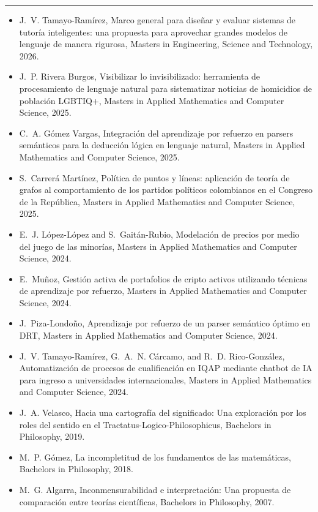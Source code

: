 \documentclass[10pt]{article}
\newcommand{\cvsection}[1]{%
  \par\vspace{0.55em}%
  \noindent{\sffamily\bfseries\MakeUppercase{#1}}\par
  \vspace{-0.35em}%
  \noindent\rule{\textwidth}{0.4pt}\par
  \vspace{0.2em}%
}
\begin{document}
\cvsection{Students Supervised}
\begin{itemize}
  \item J.~V. Tamayo-Ram\'irez, Marco general para dise\~nar y evaluar sistemas de tutor\'ia inteligentes: una propuesta para aprovechar grandes modelos de lenguaje de manera rigurosa, Masters in Engineering, Science and Technology, 2026.
  \item J.~P. Rivera Burgos, Visibilizar lo invisibilizado: herramienta de procesamiento de lenguaje natural para sistematizar noticias de homicidios de poblaci\'on LGBTIQ+, Masters in Applied Mathematics and Computer Science, 2025.
  \item C.~A. G\'omez Vargas, Integraci\'on del aprendizaje por refuerzo en parsers sem\'anticos para la deducci\'on l\'ogica en lenguaje natural, Masters in Applied Mathematics and Computer Science, 2025.
  \item S.~Carrer\'a Mart\'inez, Pol\'itica de puntos y l\'ineas: aplicaci\'on de teor\'ia de grafos al comportamiento de los partidos pol\'iticos colombianos en el Congreso de la Rep\'ublica, Masters in Applied Mathematics and Computer Science, 2025.
  \item E.~J. L\'opez-L\'opez and S.~Gait\'an-Rubio, Modelaci\'on de precios por medio del juego de las minor\'ias, Masters in Applied Mathematics and Computer Science, 2024.
  \item E.~Mu\~noz, Gesti\'on activa de portafolios de cripto activos utilizando t\'ecnicas de aprendizaje por refuerzo, Masters in Applied Mathematics and Computer Science, 2024.
  \item J.~Piza-Londo\~no, Aprendizaje por refuerzo de un parser sem\'antico \'optimo en DRT, Masters in Applied Mathematics and Computer Science, 2024.
  \item J.~V. Tamayo-Ram\'irez, G.~A.~N. C\'arcamo, and R.~D. Rico-Gonz\'alez, Automatizaci\'on de procesos de cualificaci\'on en IQAP mediante chatbot de IA para ingreso a universidades internacionales, Masters in Applied Mathematics and Computer Science, 2024.
  \item J.~A. Velasco, Hacia una cartograf\'ia del significado: Una exploraci\'on por los roles del sentido en el {Tractatus-Logico-Philosophicus}, Bachelors in Philosophy, 2019.
  \item M.~P. G\'omez, La incompletitud de los fundamentos de las matem\'aticas, Bachelors in Philosophy, 2018.
  \item M.~G. Algarra, Inconmensurabilidad e interpretaci\'on: Una propuesta de comparaci\'on entre teor\'ias cient\'ificas, Bachelors in Philosophy, 2007.
\end{itemize}
\end{document}
